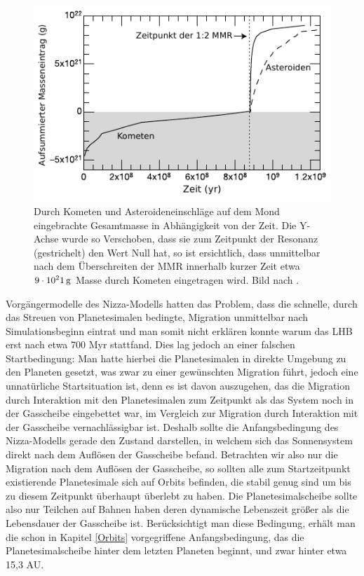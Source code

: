 \documentclass[12pt,a4paper,twoside]{article}
\renewcommand{\cite}{\citep}
\begin{document}
\begin{figure}
\centering 
\includegraphics[scale=1]{img/Gomes2005-3}
\caption{Durch Kometen und Asteroideneinschläge auf dem Mond eingebrachte Gesamtmasse in Abhängigkeit von der Zeit. Die Y-Achse wurde so Verschoben, dass sie zum Zeitpunkt der Resonanz (gestrichelt) den Wert Null hat, so ist ersichtlich, dass unmittelbar nach dem Überschreiten der MMR innerhalb kurzer Zeit etwa $\unit[9\cdot10^21]{g}$ Masse durch Kometen eingetragen wird. Bild nach \cite{Gomes2005}.}
\label{fig:LHBMasse}
\end{figure}
Vorgängermodelle des Nizza-Modells hatten das Problem, dass die schnelle, durch das Streuen von Planetesimalen bedingte, Migration unmittelbar nach Simulationsbeginn eintrat und man somit nicht erklären konnte warum das LHB erst nach etwa 700 Myr stattfand.
Dies lag jedoch an einer falschen Startbedingung: Man hatte hierbei die Planetesimalen in direkte Umgebung zu den Planeten gesetzt, was zwar zu einer gewünschten Migration führt, jedoch eine unnatürliche Startsituation ist,
denn es ist davon auszugehen, das die Migration durch Interaktion mit den Planetesimalen zum Zeitpunkt als das System noch in der Gasscheibe eingebettet war, im Vergleich zur Migration durch Interaktion mit der Gasscheibe vernachlässigbar ist.
Deshalb sollte die Anfangsbedingung des Nizza-Modells gerade den Zustand darstellen, in welchem sich das Sonnensystem direkt nach dem Auflösen der Gasscheibe befand. Betrachten wir also nur die Migration nach dem Auflösen der Gasscheibe, so sollten alle zum Startzeitpunkt existierende Planetesimale sich auf Orbits befinden, die stabil genug sind um bis zu diesem Zeitpunkt überhaupt überlebt zu haben. %
Die Planetesimalscheibe sollte also nur Teilchen auf Bahnen haben deren dynamische Lebenszeit größer als die Lebensdauer der Gasscheibe ist\cite{Gomes2005}. %
Berücksichtigt man diese Bedingung, erhält man die schon in Kapitel \ref{Orbits} vorgegriffene Anfangsbedingung, das die Planetesimalscheibe hinter dem letzten Planeten beginnt, und zwar hinter etwa 15,3 AU\cite{Gomes2005}.
\end{document}
